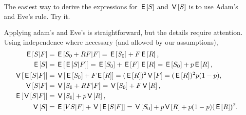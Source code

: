 \documentclass[stochastic-or.tex]{subfiles}
\begin{document}
\begin{exercise}
The easiest way to derive the expressions for $\E S$ and $\V S$ is to use Adam's and Eve's rule. Try it.
\begin{solution}
Applying adam's and Eve's is  straightforward, but the details require attention. Using independence where necessary (and allowed by our assumptions),
\begin{align*}
  \E{S|F} &= \E{S_{0} + R F|F} = \E{S_{0}} + F \E{R}, \\
  \E S &= \E{\E{S|F}} = \E{S_{0}} + \E F \E{R} = \E{S_{0}} + p \E{R}, \\
  \V{\E{S|F}} &= \V{\E{S_{0}} + F \E{R}} = (\E R)^2 \V F = (\E R)^2 p (1-p), \\
  \V{S|F} &=\V{S_0 + R F|F} = \V{S_{0}} + F \V R,\\
  \E{\V{S|F}} &= \V{S_0} + p \V R, \\
  \V S &= \E{V{S|F}} + \V{\E{S|F}} = \V{S_{0}} + p \V R + p(1-p)(\E R)^{2}.
\end{align*}
\end{solution}
\end{exercise}



\end{document}
